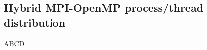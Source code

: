 \subsection{Hybrid MPI-OpenMP process/thread distribution}

\begin{frame}[t]{ABCD}
    \small
    \justifying
    \space
\end{frame}